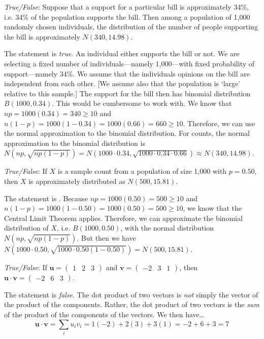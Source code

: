 \documentclass[11pt,letterpaper]{article}
\begin{document}
\quizsol \textit{True/False}: Suppose that a support for a particular bill is approximately 34\%, i.e. 34\% of the population supports the bill. Then among a population of 1,000 randomly chosen individuals, the distribution of the number of people supporting the bill is approximately $N(340, 14.98)$. \pspace

\sol The statement is \textit{true}. An individual either supports the bill or not. We are selecting a fixed number of individuals---namely 1,000---with fixed probability of support---namely 34\%. We assume that the individuals opinions on the bill are independent from each other. [We assume also that the population is `large' relative to this sample.] The support for the bill then has binomial distribution $B(1000, 0.34)$. This would be cumbersome to work with. We know that $np= 1000(0.34)= 340 \geq 10$ and $n(1 - p)= 1000(1 - 0.34)= 1000(0.66)= 660 \geq 10$. Therefore, we can use the normal approximation to the binomial distribution. For counts, the normal approximation to the binomial distribution is $N(np, \sqrt{np(1 - p)})= N(1000 \cdot 0.34, \sqrt{1000 \cdot 0.34 \cdot 0.66}) \approx N(340, 14.98)$. \pvspace{1.5cm}



\quizsol \textit{True/False}: If $X$ is a sample count from a population of size 1,000 with $p= 0.50$, then $X$ is approximately distributed as $N(500, 15.81)$. \pspace

\sol The statement is . Because $np= 1000(0.50)= 500 \geq 10$ and $n(1 - p)= 1000(1 - 0.50)= 1000 (0.50)= 500 \geq 10$, we know that the Central Limit Theorem applies. Therefore, we can approximate the binomial distribution of $X$, i.e. $B(1000,0.50)$, with the normal distribution $N(np, \sqrt{np(1 - p)})$. But then we have $N(1000 \cdot 0.50, \sqrt{1000 \cdot 0.50 (1 - 0.50)})= N(500, 15.81)$. \pvspace{1.5cm}



\quizsol \textit{True/False}: If $\mathbf{u}= \begin{pmatrix} 1 & 2 & 3 \end{pmatrix}$ and $\mathbf{v}= \begin{pmatrix} -2 & 3 & 1 \end{pmatrix}$, then $\mathbf{u} \cdot \mathbf{v}= \begin{pmatrix} -2 & 6 & 3 \end{pmatrix}$. \pspace

\sol The statement is \textit{false}. The dot product of two vectors is \textit{not} simply the vector of the product of the components. Rather, the dot product of two vectors is the \textit{sum} of the product of the components of the vectors. We then have\dots
	\[
	\mathbf{u} \cdot \mathbf{v}= \sum_i u_i v_i= 1(-2) + 2(3) + 3(1)= -2 + 6 + 3= 7 
	\]




\end{document}
